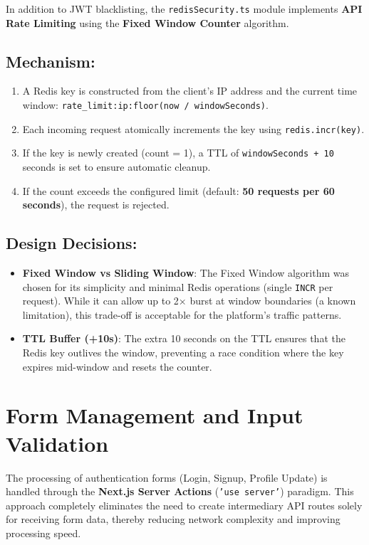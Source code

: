 In addition to JWT blacklisting, the \texttt{redisSecurity.ts} module implements \textbf{API Rate Limiting} using the \textbf{Fixed Window Counter} algorithm.

\subsection{Mechanism:}
\begin{enumerate}
\item A Redis key is constructed from the client's IP address and the current time window: \texttt{rate\_limit:{ip}:{floor(now / windowSeconds)}}.
\item Each incoming request atomically increments the key using \texttt{redis.incr(key)}.
\item If the key is newly created (count = 1), a TTL of \texttt{windowSeconds + 10} seconds is set to ensure automatic cleanup.
\item If the count exceeds the configured limit (default: \textbf{50 requests per 60 seconds}), the request is rejected.
\end{enumerate}

\subsection{Design Decisions:}
\begin{itemize}
\item \textbf{Fixed Window vs Sliding Window}: The Fixed Window algorithm was chosen for its simplicity and minimal Redis operations (single \texttt{INCR} per request). While it can allow up to 2× burst at window boundaries (a known limitation), this trade-off is acceptable for the platform's traffic patterns.
\item \textbf{TTL Buffer (+10s)}: The extra 10 seconds on the TTL ensures that the Redis key outlives the window, preventing a race condition where the key expires mid-window and resets the counter.
\end{itemize}

\section{Form Management and Input Validation}

The processing of authentication forms (Login, Signup, Profile Update) is handled through the \textbf{Next.js Server Actions} (\texttt{'use server'}) paradigm. This approach completely eliminates the need to create intermediary API routes solely for receiving form data, thereby reducing network complexity and improving processing speed.

